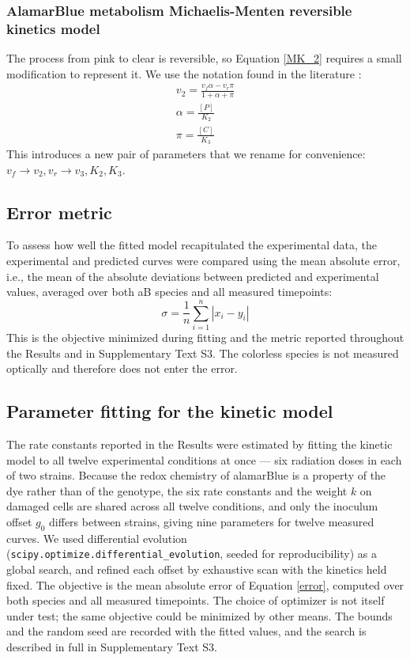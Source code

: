 \documentclass{asmarticle}
\begin{document}
\subsubsection{AlamarBlue metabolism Michaelis-Menten reversible kinetics model}\label{modelaBsection}
The process from pink to clear is reversible, so Equation \ref{MK_2} requires a small modification to represent it. We use the notation found in the literature \cite{imperial2014enzyme}:
\begin{align}
    v_2 = \frac{v_f\alpha - v_r\pi}{1+\alpha+\pi}
    \\
    \alpha = \frac{[P]}{K_2} 
    \\
    \pi = \frac{[C]}{K_3}
\end{align}
This introduces a new pair of parameters that we rename for convenience: $v_f\to v_2, v_r\to v_3, K_2, K_3$.

\subsection{Error metric}\label{fittingparam}
To assess how well the fitted model recapitulated the experimental data, the experimental and predicted curves were compared using the mean absolute error, i.e., the mean of the absolute deviations between predicted and experimental values, averaged over both aB species and all measured timepoints:
\begin{equation}
\sigma = \frac{1}{n}\sum^n_{i = 1} |x_i - y_i| \label{error}
\end{equation}
This is the objective minimized during fitting and the metric reported throughout the Results and in Supplementary Text S3. The colorless species is not measured optically and therefore does not enter the error.

\subsection{Parameter fitting for the kinetic model}
The rate constants reported in the Results were estimated by fitting the kinetic model to all twelve experimental conditions at once --- six radiation doses in each of two strains. Because the redox chemistry of alamarBlue is a property of the dye rather than of the genotype, the six rate constants and the weight $k$ on damaged cells are shared across all twelve conditions, and only the inoculum offset $g_0$ differs between strains, giving nine parameters for twelve measured curves. We used differential evolution (\texttt{scipy.optimize.differential\_evolution}, seeded for reproducibility) as a global search, and refined each offset by exhaustive scan with the kinetics held fixed. The objective is the mean absolute error of Equation \ref{error}, computed over both species and all measured timepoints. The choice of optimizer is not itself under test; the same objective could be minimized by other means. The bounds and the random seed are recorded with the fitted values, and the search is described in full in Supplementary Text S3.
\end{document}
